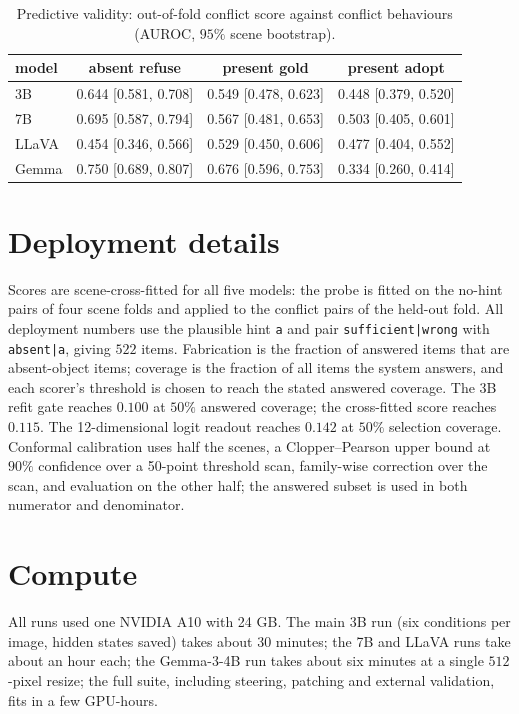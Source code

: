 \documentclass[10pt]{article}
\begin{document}
\begin{table}[h]
\centering
\small
\caption{Predictive validity: out-of-fold conflict score against conflict behaviours (AUROC, $95\%$ scene bootstrap).}
\label{tab:predict}
\begin{tabular}{lccc}
\toprule
model & absent refuse & present gold & present adopt \\
\midrule
3B & 0.644 [0.581, 0.708] & 0.549 [0.478, 0.623] & 0.448 [0.379, 0.520] \\
7B & 0.695 [0.587, 0.794] & 0.567 [0.481, 0.653] & 0.503 [0.405, 0.601] \\
LLaVA & 0.454 [0.346, 0.566] & 0.529 [0.450, 0.606] & 0.477 [0.404, 0.552] \\
Gemma & 0.750 [0.689, 0.807] & 0.676 [0.596, 0.753] & 0.334 [0.260, 0.414] \\
\bottomrule
\end{tabular}
\end{table}

\section{Deployment details}

Scores are scene-cross-fitted for all five models: the probe is fitted on the no-hint pairs of four scene folds and applied to the conflict pairs of the held-out fold. All deployment numbers use the plausible hint \texttt{a} and pair \texttt{sufficient|wrong} with \texttt{absent|a}, giving $522$ items. Fabrication is the fraction of answered items that are absent-object items; coverage is the fraction of all items the system answers, and each scorer's threshold is chosen to reach the stated answered coverage. The 3B refit gate reaches $0.100$ at $50\%$ answered coverage; the cross-fitted score reaches $0.115$. The 12-dimensional logit readout reaches $0.142$ at $50\%$ selection coverage. Conformal calibration uses half the scenes, a Clopper--Pearson upper bound at $90\%$ confidence over a 50-point threshold scan, family-wise correction over the scan, and evaluation on the other half; the answered subset is used in both numerator and denominator.

\section{Compute}
\label{app:compute}

All runs used one NVIDIA A10 with 24 GB. The main 3B run (six conditions per image, hidden states saved) takes about 30 minutes; the 7B and LLaVA runs take about an hour each; the Gemma-3-4B run takes about six minutes at a single $512$-pixel resize; the full suite, including steering, patching and external validation, fits in a few GPU-hours.
\end{document}
